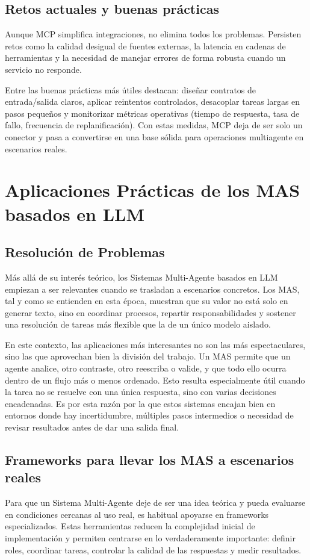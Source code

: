 \documentclass[12pt,a4paper]{article}
\begin{document}
\subsection{Retos actuales y buenas prácticas}

Aunque MCP simplifica integraciones, no elimina todos los problemas. Persisten retos como la calidad desigual de fuentes externas, la latencia en cadenas de herramientas y la necesidad de manejar errores de forma robusta cuando un servicio no responde.

Entre las buenas prácticas más útiles destacan: diseñar contratos de entrada/salida claros, aplicar reintentos controlados, desacoplar tareas largas en pasos pequeños y monitorizar métricas operativas (tiempo de respuesta, tasa de fallo, frecuencia de replanificación). Con estas medidas, MCP deja de ser solo un conector y pasa a convertirse en una base sólida para operaciones multiagente en escenarios reales.

\section{Aplicaciones Prácticas de los MAS basados en LLM}
\subsection{Resolución de Problemas}
Más allá de su interés teórico, los Sistemas Multi-Agente basados en LLM empiezan a ser relevantes cuando se trasladan a escenarios concretos. Los MAS, tal y como se entienden en esta época, muestran que su valor no está solo en generar texto, sino en coordinar procesos, repartir responsabilidades y sostener una resolución de tareas más flexible que la de un único modelo aislado.

En este contexto, las aplicaciones más interesantes no son las más espectaculares, sino las que aprovechan bien la división del trabajo. Un MAS permite que un agente analice, otro contraste, otro reescriba o valide, y que todo ello ocurra dentro de un flujo más o menos ordenado. Esto resulta especialmente útil cuando la tarea no se resuelve con una única respuesta, sino con varias decisiones encadenadas. Es por esta razón por la que estos sistemas encajan bien en entornos donde hay incertidumbre, múltiples pasos intermedios o necesidad de revisar resultados antes de dar una salida final.

\subsection{Frameworks para llevar los MAS a escenarios reales}
Para que un Sistema Multi-Agente deje de ser una idea teórica y pueda evaluarse en condiciones cercanas al uso real, es habitual apoyarse en frameworks especializados. Estas herramientas reducen la complejidad inicial de implementación y permiten centrarse en lo verdaderamente importante: definir roles, coordinar tareas, controlar la calidad de las respuestas y medir resultados.
\end{document}
